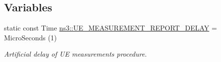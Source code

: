 \subsection*{Variables}
\begin{DoxyCompactItemize}
\item 
static const Time \hyperlink{namespacens3_a3b1e0ebbbc32a13ed008f61cafe1e9c8}{ns3\+::\+U\+E\+\_\+\+M\+E\+A\+S\+U\+R\+E\+M\+E\+N\+T\+\_\+\+R\+E\+P\+O\+R\+T\+\_\+\+D\+E\+L\+AY} = Micro\+Seconds (1)
\begin{DoxyCompactList}\small\item\em Artificial delay of UE measurements procedure. \end{DoxyCompactList}\end{DoxyCompactItemize}
